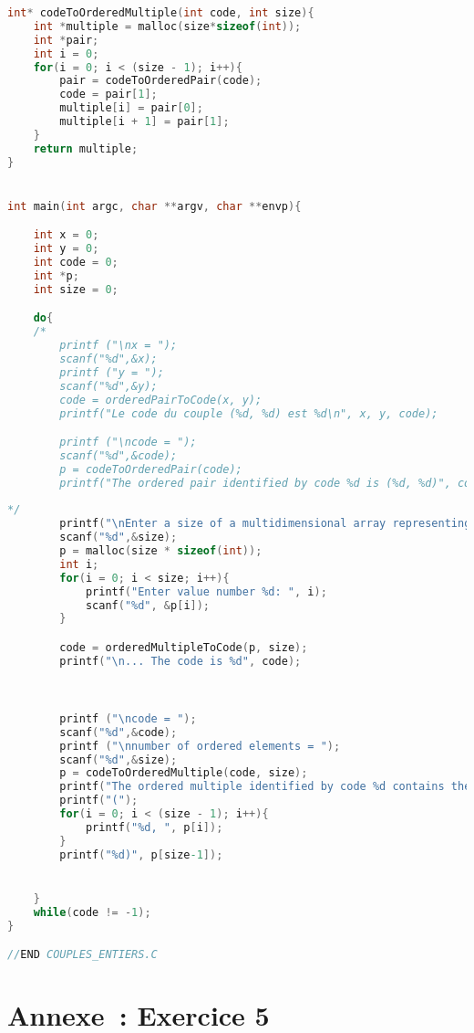 \documentclass{article}
\begin{document}
\begin{lstlisting}[language=C, basicstyle=\footnotesize]
int* codeToOrderedMultiple(int code, int size){
	int *multiple = malloc(size*sizeof(int));
	int *pair;
	int i = 0;
	for(i = 0; i < (size - 1); i++){
		pair = codeToOrderedPair(code);
		code = pair[1];
		multiple[i] = pair[0];
		multiple[i + 1] = pair[1];
	}
	return multiple;
}


int main(int argc, char **argv, char **envp){

	int x = 0;
	int y = 0;
	int code = 0;
	int *p;
	int size = 0;

	do{
	/*
		printf ("\nx = ");
		scanf("%d",&x);
		printf ("y = ");
		scanf("%d",&y);
		code = orderedPairToCode(x, y);
		printf("Le code du couple (%d, %d) est %d\n", x, y, code);

		printf ("\ncode = ");
		scanf("%d",&code);
		p = codeToOrderedPair(code);
		printf("The ordered pair identified by code %d is (%d, %d)", code, p[0], p[1]);
	
*/			
		printf("\nEnter a size of a multidimensional array representing a 'ordered multiple': ");
		scanf("%d",&size);
		p = malloc(size * sizeof(int));
		int i;
		for(i = 0; i < size; i++){
			printf("Enter value number %d: ", i);
			scanf("%d", &p[i]);
		}

		code = orderedMultipleToCode(p, size);
		printf("\n... The code is %d", code);
	


		printf ("\ncode = ");
		scanf("%d",&code);
		printf ("\nnumber of ordered elements = ");
		scanf("%d",&size);
		p = codeToOrderedMultiple(code, size);
		printf("The ordered multiple identified by code %d contains the following elements: ", code);
		printf("(");
		for(i = 0; i < (size - 1); i++){
			printf("%d, ", p[i]);
		}
		printf("%d)", p[size-1]);


	}
	while(code != -1);
}

//END COUPLES_ENTIERS.C
\end{lstlisting}
\newpage
\section{Annexe~: Exercice 5}
\label{annexeexo5}

\end{document}
